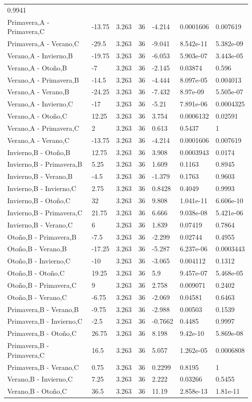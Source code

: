 \documentclass[]{book}
\theoremstyle{definition}
\theoremstyle{definition}
\theoremstyle{definition}
\theoremstyle{remark}
\begin{document}
\begin{longtable}[]{@{}lllllll@{}}
0.9941\tabularnewline
Primavera,A - Primavera,C & -13.75 & 3.263 & 36 & -4.214 & 0.0001606 &
0.007619\tabularnewline
Primavera,A - Verano,C & -29.5 & 3.263 & 36 & -9.041 & 8.542e-11 &
5.382e-09\tabularnewline
Verano,A - Invierno,B & -19.75 & 3.263 & 36 & -6.053 & 5.903e-07 &
3.443e-05\tabularnewline
Verano,A - Otoño,B & -7 & 3.263 & 36 & -2.145 & 0.03874 &
0.596\tabularnewline
Verano,A - Primavera,B & -14.5 & 3.263 & 36 & -4.444 & 8.097e-05 &
0.004013\tabularnewline
Verano,A - Verano,B & -24.25 & 3.263 & 36 & -7.432 & 8.97e-09 &
5.505e-07\tabularnewline
Verano,A - Invierno,C & -17 & 3.263 & 36 & -5.21 & 7.891e-06 &
0.0004325\tabularnewline
Verano,A - Otoño,C & 12.25 & 3.263 & 36 & 3.754 & 0.0006132 &
0.02591\tabularnewline
Verano,A - Primavera,C & 2 & 3.263 & 36 & 0.613 & 0.5437 &
1\tabularnewline
Verano,A - Verano,C & -13.75 & 3.263 & 36 & -4.214 & 0.0001606 &
0.007619\tabularnewline
Invierno,B - Otoño,B & 12.75 & 3.263 & 36 & 3.908 & 0.0003943 &
0.0174\tabularnewline
Invierno,B - Primavera,B & 5.25 & 3.263 & 36 & 1.609 & 0.1163 &
0.8945\tabularnewline
Invierno,B - Verano,B & -4.5 & 3.263 & 36 & -1.379 & 0.1763 &
0.9603\tabularnewline
Invierno,B - Invierno,C & 2.75 & 3.263 & 36 & 0.8428 & 0.4049 &
0.9993\tabularnewline
Invierno,B - Otoño,C & 32 & 3.263 & 36 & 9.808 & 1.041e-11 &
6.606e-10\tabularnewline
Invierno,B - Primavera,C & 21.75 & 3.263 & 36 & 6.666 & 9.038e-08 &
5.421e-06\tabularnewline
Invierno,B - Verano,C & 6 & 3.263 & 36 & 1.839 & 0.07419 &
0.7864\tabularnewline
Otoño,B - Primavera,B & -7.5 & 3.263 & 36 & -2.299 & 0.02744 &
0.4955\tabularnewline
Otoño,B - Verano,B & -17.25 & 3.263 & 36 & -5.287 & 6.237e-06 &
0.0003443\tabularnewline
Otoño,B - Invierno,C & -10 & 3.263 & 36 & -3.065 & 0.004112 &
0.1312\tabularnewline
Otoño,B - Otoño,C & 19.25 & 3.263 & 36 & 5.9 & 9.457e-07 &
5.468e-05\tabularnewline
Otoño,B - Primavera,C & 9 & 3.263 & 36 & 2.758 & 0.009071 &
0.2402\tabularnewline
Otoño,B - Verano,C & -6.75 & 3.263 & 36 & -2.069 & 0.04581 &
0.6463\tabularnewline
Primavera,B - Verano,B & -9.75 & 3.263 & 36 & -2.988 & 0.00503 &
0.1539\tabularnewline
Primavera,B - Invierno,C & -2.5 & 3.263 & 36 & -0.7662 & 0.4485 &
0.9997\tabularnewline
Primavera,B - Otoño,C & 26.75 & 3.263 & 36 & 8.198 & 9.42e-10 &
5.869e-08\tabularnewline
Primavera,B - Primavera,C & 16.5 & 3.263 & 36 & 5.057 & 1.262e-05 &
0.0006808\tabularnewline
Primavera,B - Verano,C & 0.75 & 3.263 & 36 & 0.2299 & 0.8195 &
1\tabularnewline
Verano,B - Invierno,C & 7.25 & 3.263 & 36 & 2.222 & 0.03266 &
0.5455\tabularnewline
Verano,B - Otoño,C & 36.5 & 3.263 & 36 & 11.19 & 2.858e-13 &
1.81e-11\tabularnewline

\end{longtable}
\end{document}
